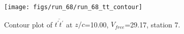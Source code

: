 \begin{figure}[H]
\centering
\texttt{[image: figs/run\_68/run\_68\_tt\_contour]}
\caption{Contour plot of $\overline{t^\prime t^\prime}$ at $z/c$=10.00, $V_{free}$=29.17, station 7.}
\label{fig:run_68_tt_contour}
\end{figure}


